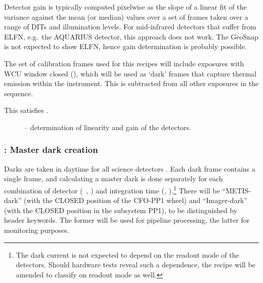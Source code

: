 Detector gain is typically computed pixelwise as the slope of a linear
fit of the variance against the mean (or median) values over a set of
frames taken over a range of DITs and illumination levels.  For
mid-infrared detectors that suffer from \ac{ELFN}, e.g.\ the AQUARIUS
detector, this approach does not work.  The GeoSnap is not expected to
show \ac{ELFN}, hence gain determination is probably possible.

The set of calibration frames used for this recipes will include
exposures with WCU window closed (), which will be used
as `dark' frames that capture thermal emission within the
instrument. This is subtracted from all other exposures in the
sequence.

This satisfies .

\newpage


\begin{figure}[hb]
  \centering
    \def \globalscale {0.700000}
    \fontsize{10}{12}\selectfont
    
  \caption[Recipe: ]{ --
    determination of linearity and gain of the detectors.}
  \label{Fig:rec_det_lingain}
\end{figure}

\clearpage

\subsubsection{: Master dark creation}
\label{sssec:metis_det_dark}
\label{rec:det_dark}
\label{rec:metis_det_dark}

Darks are taken in daytime for all science detectors
\cite{METIS-calibration_plan}.  Each dark frame contains a single frame, and calculating a master dark
is done separately for each combination of detector (~, ) and integration time
(, ).\footnote{The dark current is not expected to depend on the readout mode of the detectors. Should hardware tests reveal such a dependence, the recipe will be amended to classify on readout mode as well.} There will be ``METIS-dark''
(with the CLOSED position of the CFO-PP1 wheel) and ``Imager-dark''
(with the CLOSED position in the subsystem PP1), to be distinguished
by header keywords.
The former will be used for pipeline processing, the  latter for monitoring purposes.

